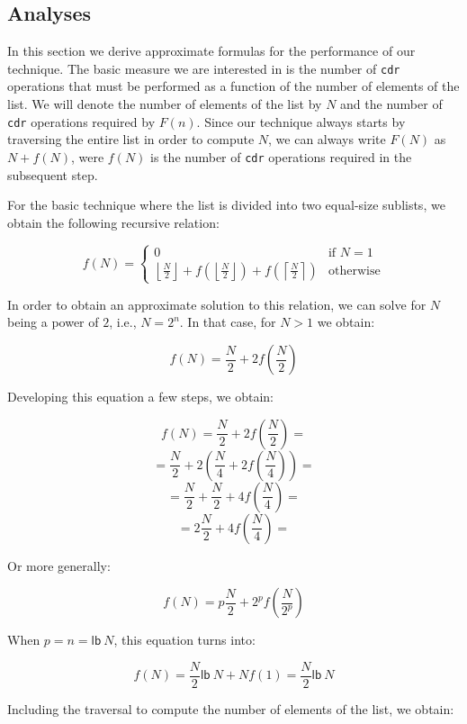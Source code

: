 \subsection{Analyses}
\label{sec-analyses}

In this section we derive approximate formulas for the performance of
our technique.  The basic measure we are interested in is the number
of \texttt{cdr} operations that must be performed as a function of the
number of elements of the list.  We will denote the number of elements
of the list by $N$ and the number of \texttt{cdr} operations required
by $F(n)$.  Since our technique always starts by traversing the entire
list in order to compute $N$, we can always write $F(N)$ as $N +
f(N)$, were $f(N)$ is the number of \texttt{cdr} operations required
in the subsequent step.

For the basic technique where the list is divided into two equal-size
sublists, we obtain the following recursive relation:

\[ f(N) = \left\{ \begin{array}{ll}
                    0 & \mbox{if $N = 1$} \\
                    \left\lfloor\frac{N}{2}\right\rfloor
                    + f(\left\lfloor\frac{N}{2}\right\rfloor)
                    + f(\left\lceil\frac{N}{2}\right\rceil) &
                    \mbox{otherwise}
                  \end{array} \right. \]

In order to obtain an approximate solution to this relation, we can
solve for $N$ being a power of $2$, i.e., $N = 2^n$.  In that case,
for $N>1$ we obtain:

\[ f(N) = \frac{N}{2} + 2f(\frac{N}{2}) \]

Developing this equation a few steps, we obtain:

\[ f(N) = \frac{N}{2} + 2f(\frac{N}{2}) = \]
\[ = \frac{N}{2} + 2(\frac{N}{4} + 2f(\frac{N}{4})) =\]
\[ = \frac{N}{2} + \frac{N}{2} + 4f(\frac{N}{4}) =\]
\[ = 2\frac{N}{2} + 4f(\frac{N}{4}) = \]

Or more generally:

\[ f(N) = p\frac{N}{2} + 2^pf(\frac{N}{2^p})\]

When $p = n = \mathsf{lb}~N$, this equation turns into:

\[ f(N) = \frac{N}{2}\mathsf{lb}~N + Nf(1) = \frac{N}{2}\mathsf{lb}~N\]

Including the traversal to compute the number of elements of the list,
we obtain:

